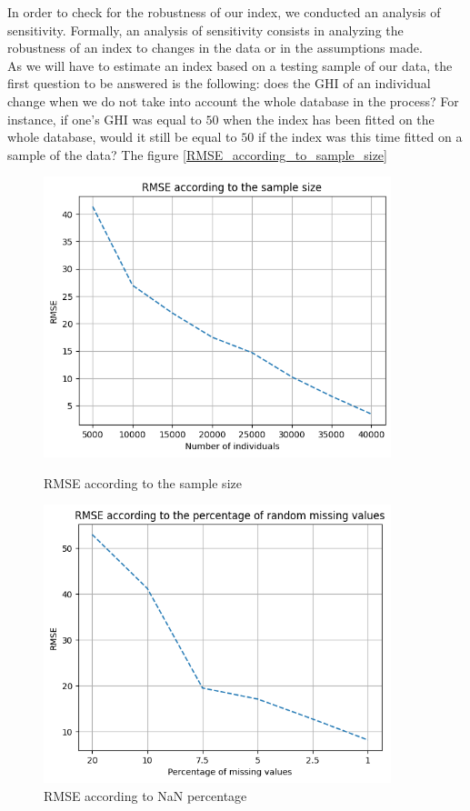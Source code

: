 \documentclass[]{article}
\begin{document}
\noindent
In order to check for the robustness of our index, we conducted an analysis of sensitivity. Formally, an analysis of sensitivity consists in analyzing the robustness of an index to changes in the data or in the assumptions made.\\
As we will have to estimate an index based on a testing sample of our data, the first question to be answered is the following: does the GHI of an individual change when we do not take into account the whole database in the process? For instance, if one's GHI was equal to $50$ when the index has been fitted on the whole database, would it still be equal to $50$ if the index was this time fitted on a sample of the data? The figure \ref{RMSE_according_to_sample_size}
\begin{figure}[!h]
	\centering
	\begin{minipage}{0.45\textwidth}
		\centering
		\includegraphics[width=0.9\textwidth]{tSNE_GHI_RMSE_according_to_sample_size.png} %
		\caption{RMSE according to the sample size}
		\label{RMSE_according_to_sample_size}
	\end{minipage}\hfill
	\begin{minipage}{0.45\textwidth}
		\centering
		\includegraphics[width=0.9\textwidth]{tSNE_GHI_RMSE_according_to_percentage_NaN.png} %
		\caption{RMSE according to NaN percentage}
		\label{RMSE_according_to_percentage_nan}
	\end{minipage}
\end{figure}
\end{document}
